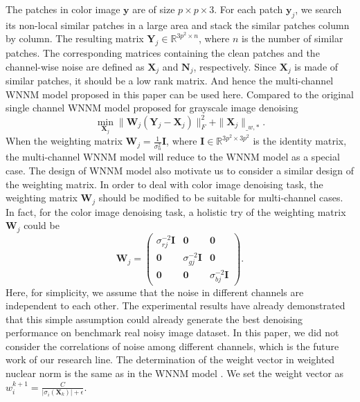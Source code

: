 \documentclass[10pt,twocolumn,letterpaper]{article}
\begin{document}
The patches in color image $\mathbf{y}$  are of size $p\times p\times 3$. For each patch $\mathbf{y}_{j}$, we search its non-local similar patches in a large area and stack the similar patches column by column. The resulting matrix $\mathbf{Y}_{j}\in\mathbb{R}^{3p^{2}\times n}$, where $n$ is the number of similar patches. The corresponding matrices containing the clean patches and the channel-wise noise are defined as $\mathbf{X}_{j}$ and $\mathbf{N}_{j}$, respectively. Since $\mathbf{X}_{j}$ is made of similar patches, it should be a low rank matrix. And hence the multi-channel WNNM model proposed in this paper can be used here. Compared to the original single channel WNNM model \cite{wnnm} proposed for grayscale image denoising
\begin{equation}
\min_{\mathbf{X}_{j}}
\|
\mathbf{W}_{j}
(\mathbf{Y}_{j}
-
\mathbf{X}_{j})
\|_{F}^{2}
+
\|
\mathbf{X}_{j}\|_{\bm_{w},*}.
\end{equation}
When the weighting matrix $\mathbf{W}_{j}=\frac{1}{\sigma_{n}^{2}}\mathbf{I}
$, where $\mathbf{I}
\in\mathbb{R}^{3p^{2}\times 3p^{2}}$ is the identity matrix, the multi-channel WNNM model will reduce to the WNNM model as a special case. The design of WNNM model also motivate us to consider a similar design of the weighting matrix. In order to deal with color image denoising task, 
the weighting matrix $\mathbf{W}_{j}$ should be modified to be suitable for multi-channel cases. In fact, for the color image denoising task, a holistic try of the weighting matrix $\mathbf{W}_{j}$ could be 
\begin{equation}
\mathbf{W}_{j}
=
\left( \begin{array}{ccc}
\sigma_{rj}^{-2}\mathbf{I} & \mathbf{0} & \mathbf{0}
\\
\mathbf{0} & \sigma_{gj}^{-2}\mathbf{I} & \mathbf{0}
\\
\mathbf{0} & \mathbf{0} & \sigma_{bj}^{-2}\mathbf{I}
\end{array} \right).
\end{equation}
Here, for simplicity, we assume that the noise in different channels are independent to each other. The experimental results have already demonstrated that this simple assumption could already generate the best denoising performance on benchmark real noisy image dataset. In this paper, we did not consider the correlations of noise among different channels, which is the future work of our research line. The determination of the weight vector in weighted nuclear norm is the same as in the WNNM model \cite{wnnmijcv}. We set the weight vector as $w_{i}^{k+1}=\frac{C}{|\sigma_{i}(\mathbf{X}_{k})|+\epsilon }$. 
\end{document}
